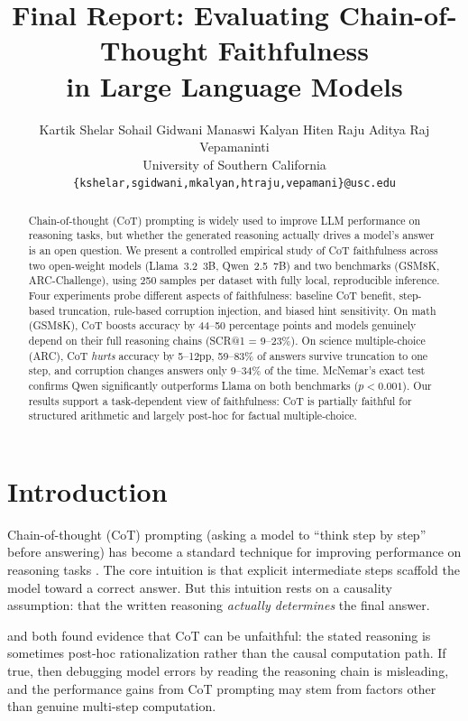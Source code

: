 \documentclass[11pt,twocolumn]{article}
\title{\textbf{Final Report: Evaluating Chain-of-Thought Faithfulness\\
  in Large Language Models}}
\author{
  Kartik Shelar \quad Sohail Gidwani \quad Manaswi Kalyan \quad
  Hiten Raju \quad Aditya Raj Vepamaninti \\[4pt]
  University of Southern California \\
  \texttt{\{kshelar,sgidwani,mkalyan,htraju,vepamani\}@usc.edu}
}
\date{}
\begin{document}
\maketitle

\begin{abstract}
Chain-of-thought (CoT) prompting is widely used to improve LLM performance on
reasoning tasks, but whether the generated reasoning actually drives a model's
answer is an open question. We present a controlled empirical study of CoT
faithfulness across two open-weight models (Llama~3.2~3B, Qwen~2.5~7B) and two
benchmarks (GSM8K, ARC-Challenge), using 250 samples per dataset with fully
local, reproducible inference. Four experiments probe different aspects of
faithfulness: baseline CoT benefit, step-based truncation, rule-based corruption
injection, and biased hint sensitivity. On math (GSM8K), CoT boosts accuracy
by 44--50 percentage points and models genuinely depend on their full reasoning
chains (SCR@1 = 9--23\%). On science multiple-choice (ARC), CoT \emph{hurts}
accuracy by 5--12pp, 59--83\% of answers survive truncation to one step, and
corruption changes answers only 9--34\% of the time. McNemar's exact test confirms
Qwen significantly outperforms Llama on both benchmarks ($p < 0.001$). Our
results support a task-dependent view of faithfulness: CoT is partially faithful
for structured arithmetic and largely post-hoc for factual multiple-choice.
\end{abstract}


\section{Introduction}

Chain-of-thought (CoT) prompting (asking a model to ``think step by step''
before answering) has become a standard technique for improving performance on
reasoning tasks \citep{wei2022chain}. The core intuition is that explicit
intermediate steps scaffold the model toward a correct answer. But this
intuition rests on a causality assumption: that the written reasoning
\emph{actually determines} the final answer.

\citet{lanham2023measuring} and \citet{turpin2023language} both found evidence
that CoT can be unfaithful: the stated reasoning is sometimes post-hoc
rationalization rather than the causal computation path. If true, then
debugging model errors by reading the reasoning chain is misleading, and the
performance gains from CoT prompting may stem from factors other than genuine
multi-step computation.
\end{document}
